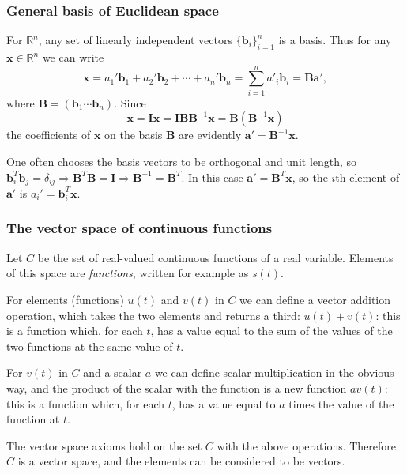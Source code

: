 \documentclass[10pt]{beamer}
\begin{document}
\begin{frame}
  \frametitle{General basis of Euclidean space}
  For $\mathbb{R}^n$, any set of linearly independent vectors $\{\mathbf{b}_i\}_{i=1}^n$ is a basis.  Thus for any $\mathbf{x}  \in \mathbb{R}^n$ we can write 
  \begin{equation*}
    \mathbf{x} = a_1' \mathbf{b}_1 + a_2' \mathbf{b}_2 + \cdots + a_n' \mathbf{b}_n = \sum_{i=1}^n a'_i \mathbf{b}_i = \mathbf{B} \mathbf{a}',
  \end{equation*}
  where $\mathbf{B} = (\mathbf{b}_1 \cdots \mathbf{b}_n)$.  Since
  \begin{equation*}
    \mathbf{x} = \mathbf{I} \mathbf{x} = \mathbf{I} \mathbf{B} \mathbf{B}^{-1} \mathbf{x} = \mathbf{B} (\mathbf{B}^{-1} \mathbf{x})
\end{equation*}
the coefficients of $\mathbf{x}$ on the basis $\mathbf{B}$ are evidently $\mathbf{a}' = \mathbf{B}^{-1} \mathbf{x}$.
  
 One often chooses the basis vectors to be orthogonal and unit length, so $\mathbf{b}_i^T \mathbf{b}_j = \delta_{ij} \Longrightarrow 
  \mathbf{B}^T \mathbf{B} = \mathbf{I} \Longrightarrow \mathbf{B}^{-1} = \mathbf{B}^T$.  In this case $\mathbf{a}' = \mathbf{B}^T \mathbf{x}$, so the $i$th element of $\mathbf{a}'$ is $a_i' = \mathbf{b}_i^T \mathbf{x}$.
\end{frame}

\begin{frame}
  \frametitle{The vector space of continuous functions}
  Let $C$ be the set of real-valued continuous functions of a real variable.  Elements of this space are {\em functions}, written for example as $s(t)$.  
  
  For elements (functions) $u(t)$ and $v(t)$ in $C$ we can define a vector addition operation, which takes the two elements and returns a third:  $u(t) + v(t)$:  this is a function which, for each $t$, has a value equal to the sum of the values of the two functions at the same value of $t$.
  
  For $v(t)$ in $C$ and a scalar $a$ we can define scalar multiplication in the obvious way, and the product of the scalar with the function is a new function $a v(t)$:  this is a function which, for each $t$, has a value equal to $a$ times the value of the function at $t$.
  
  The vector space axioms hold on the set $C$ with the above operations.  Therefore $C$ is a vector space, and the elements can be considered to be vectors.
  
\end{frame}
\end{document}
